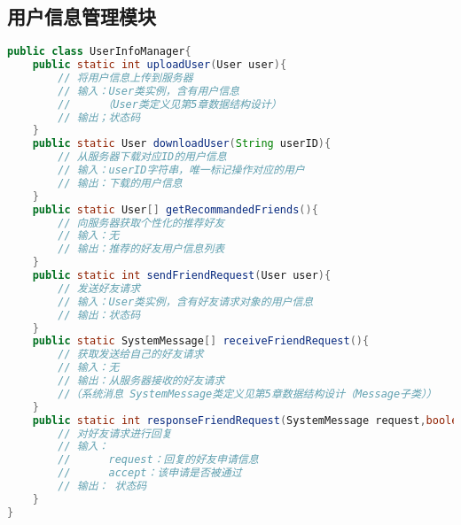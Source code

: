 \subsection{\color{red}用户信息管理模块}
\begin{lstlisting}[language=Java, caption=用户信息管理模块接口]
public class UserInfoManager{
    public static int uploadUser(User user){
        // 将用户信息上传到服务器
        // 输入：User类实例，含有用户信息
        //     （User类定义见第5章数据结构设计）
        // 输出；状态码
    }
    public static User downloadUser(String userID){
        // 从服务器下载对应ID的用户信息
        // 输入：userID字符串，唯一标记操作对应的用户
        // 输出：下载的用户信息
    }
    public static User[] getRecommandedFriends(){
        // 向服务器获取个性化的推荐好友
        // 输入：无
        // 输出：推荐的好友用户信息列表
    }
    public static int sendFriendRequest(User user){
        // 发送好友请求
        // 输入：User类实例，含有好友请求对象的用户信息
        // 输出：状态码
    }
    public static SystemMessage[] receiveFriendRequest(){
        // 获取发送给自己的好友请求
        // 输入：无
        // 输出：从服务器接收的好友请求
        //（系统消息 SystemMessage类定义见第5章数据结构设计（Message子类））
    }
    public static int responseFriendRequest(SystemMessage request,boolean accept){
        // 对好友请求进行回复
        // 输入：
        //      request：回复的好友申请信息
        //      accept：该申请是否被通过
        // 输出： 状态码
    }
}

\end{lstlisting}




